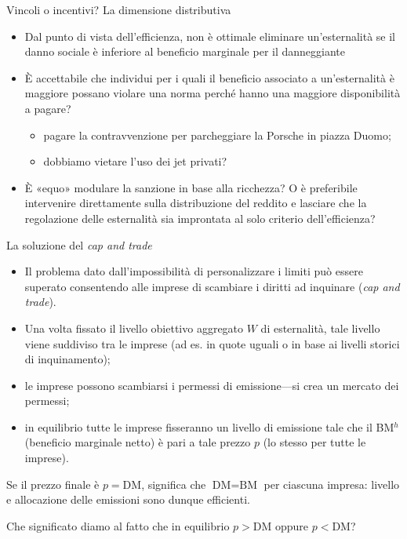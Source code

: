 \documentclass[aspectratio=64,12pt]{beamer}
\begin{document}
\begin{frame}{Vincoli o incentivi? La dimensione distributiva}
\begin{itemize}
\item Dal punto di vista dell’efficienza, non è ottimale eliminare
un’esternalità se il danno sociale è inferiore al beneficio marginale per il
danneggiante
\item È accettabile che individui per i quali il beneficio associato a
un’esternalità è maggiore possano violare una norma perché hanno una maggiore
disponibilità a pagare?
\begin{itemize}
\item pagare la contravvenzione per parcheggiare la Porsche in piazza Duomo;
\item dobbiamo vietare l’uso dei jet privati?
\end{itemize}
\item È «equo» modulare la sanzione in base alla ricchezza? O è preferibile
intervenire direttamente sulla distribuzione del reddito e lasciare che la
regolazione delle esternalità sia improntata al solo criterio dell’efficienza?
\end{itemize}
\end{frame}

\begin{frame}{La soluzione del \emph{cap and trade}}
\begin{itemize}
\item Il problema dato dall'impossibilità di personalizzare i limiti può
essere superato consentendo alle imprese di scambiare i diritti ad inquinare
(\emph{cap and trade}).
\item Una volta fissato il livello obiettivo aggregato $W$ di esternalità,
tale livello viene suddiviso tra le imprese (ad es. in quote uguali o in base
ai livelli storici di inquinamento);
\item le imprese possono scambiarsi i permessi di emissione---si crea un
mercato dei permessi;
\item in equilibrio tutte le imprese fisseranno un livello di emissione tale
che il BM$^{h}$ (beneficio marginale netto) è pari a tale prezzo $p$ (lo
stesso per tutte le imprese).
\end{itemize}
\begin{block}{} Se il prezzo finale è $p=\text{DM}$, significa che
$\text{DM}=\text{BM}$ per ciascuna impresa: livello e allocazione delle
emissioni sono dunque efficienti.

Che significato diamo al fatto che in equilibrio $p>\text{DM}$ oppure
$p<\text{DM}$?
\end{block}
\end{frame}
\end{document}
